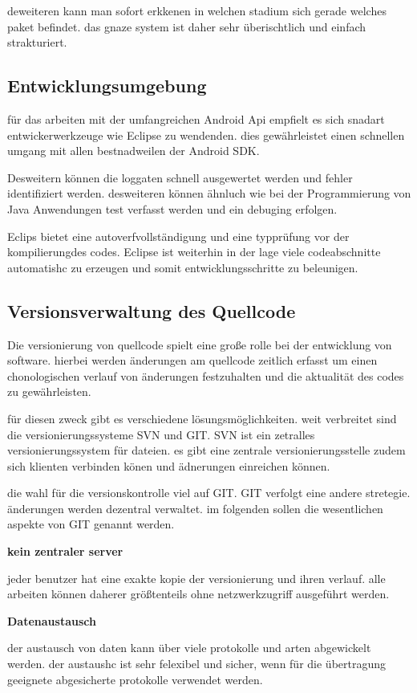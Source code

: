 deweiteren kann man sofort erkkenen in welchen stadium sich gerade welches paket befindet. das gnaze system ist daher sehr überischtlich und einfach strakturiert.

\subsection{Entwicklungsumgebung}
für das arbeiten mit der umfangreichen Android Api empfielt es sich snadart entwickerwerkzeuge wie Eclipse zu wendenden. dies gewährleistet einen schnellen umgang mit allen bestnadweilen der Android SDK.

Desweitern können die loggaten schnell ausgewertet werden und fehler identifiziert werden. desweiteren können ähnluch wie bei der Programmierung von Java Anwendungen test verfasst werden und ein debuging erfolgen.

Eclips bietet eine autoverfvollständigung und eine typprüfung vor der kompilierungdes codes. Eclipse ist weiterhin in der lage viele codeabschnitte automatishc zu erzeugen und somit entwicklungsschritte zu beleunigen.

\subsection{Versionsverwaltung des Quellcode}
Die versionierung von quellcode spielt eine große rolle bei der entwicklung von software. hierbei werden änderungen am quellcode zeitlich erfasst um einen chonologischen verlauf von änderungen festzuhalten und die aktualität des codes zu gewährleisten.

für diesen zweck gibt es verschiedene lösungsmöglichkeiten. weit verbreitet sind die versionierungssysteme SVN und GIT.
SVN ist ein zetralles versionierungssystem für dateien.  es gibt eine zentrale versionierungsstelle zudem sich klienten verbinden könen und ädnerungen einreichen können.

die wahl für die versionskontrolle viel auf GIT. GIT verfolgt eine andere stretegie. änderungen werden dezentral verwaltet. im folgenden sollen die wesentlichen aspekte von GIT genannt werden.

\textbf{kein zentraler server}

jeder benutzer hat eine exakte kopie der versionierung und ihren verlauf. alle arbeiten können daherer größtenteils ohne netzwerkzugriff ausgeführt werden.

\textbf{Datenaustausch}

der austausch von daten kann über viele protokolle und arten abgewickelt werden. der austaushc ist sehr felexibel und sicher, wenn für die übertragung geeignete abgesicherte protokolle verwendet werden.


